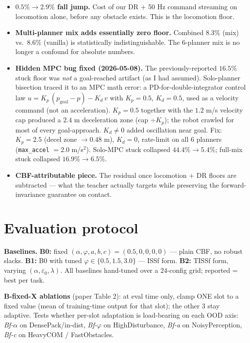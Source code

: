 \documentclass[11pt]{article}
\begin{document}
\begin{itemize}
  \item \textbf{$0.5\% \to 2.9\%$ fall jump.} Cost of our DR $+$ 50 Hz command streaming on locomotion alone, before any obstacle exists. This is the locomotion floor.
  \item \textbf{Multi-planner mix adds essentially zero floor.} Combined $8.3\%$ (mix) vs.\ $8.6\%$ (vanilla) is statistically indistinguishable. The 6-planner mix is no longer a confound for absolute numbers.
  \item \textbf{Hidden MPC bug fixed (2026-05-08).} The previously-reported $16.5\%$ stuck floor was \emph{not} a goal-reached artifact (as I had assumed). Solo-planner bisection traced it to an MPC math error: a PD-for-double-integrator control law $u = K_p\,(p_{\text{goal}} - p) - K_d\,v$ with $K_p = 0.5$, $K_d = 0.5$, used as a velocity command (not an acceleration). $K_p = 0.5$ together with the $1.2$ m/s velocity cap produced a $2.4$ m deceleration zone (cap $\div K_p$); the robot crawled for most of every goal-approach. $K_d \neq 0$ added oscillation near goal. Fix: $K_p = 2.5$ (decel zone $\to 0.48$ m), $K_d = 0$, rate-limit on all 6 planners (\texttt{max\_accel} $= 2.0$ m/s$^{2}$). Solo-MPC stuck collapsed $44.4\% \to 5.4\%$; full-mix stuck collapsed $16.9\% \to 6.5\%$.
  \item \textbf{CBF-attributable piece.} The residual once locomotion $+$ DR floors are subtracted --- what the teacher actually targets while preserving the forward-invariance guarantee on contact.
\end{itemize}

\section{Evaluation protocol}

\textbf{Baselines.} \;
\textbf{B0:} fixed $(\alpha,\varphi,a,b,c) = (0.5, 0, 0, 0, 0)$ --- plain CBF,
no robust slacks. \;
\textbf{B1:} B0 with tuned $\varphi \in \{0.5, 1.5, 3.0\}$ --- ISSf form. \;
\textbf{B2:} TISSf form, varying $(\alpha, \varepsilon_0, \lambda)$. \;
All baselines hand-tuned over a $24$-config grid; reported = best per task.

\noindent
\textbf{B-fixed-X ablations} (paper Table 2): at eval time only, clamp ONE
slot to a fixed value (mean of training-time output for that slot); the other
3 stay adaptive. Tests whether per-slot adaptation is load-bearing on each OOD
axis: \emph{Bf-$\alpha$} on DensePack/in-dist, \emph{Bf-$\varphi$} on
HighDisturbance, \emph{Bf-a} on NoisyPerception, \emph{Bf-c} on HeavyCOM /
FastObstacles.
\end{document}
